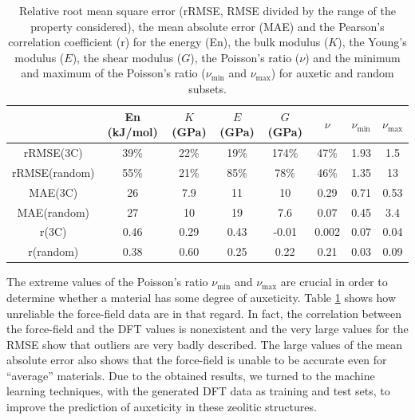 \documentclass[journal=jacsat,manuscript=article]{achemso}
\begin{document}
\begin{table}[ht]
\small
\centering
\begin{tabular}{|c|c|c|c|c|c|c|c|}
\hline
 &En (kJ/mol) & $K$ (GPa)&$E$ (GPa)&$G$ (GPa)&$\nu$&$\nu_{\min}$ & $\nu_{\max}$\\
\hline
rRMSE(3C)         & 39\%          & 22\%         & 19\%        & 174\%      & 47\% & 1.93         & 1.5 \\
rRMSE(random)& 55\%          & 21\%         & 85\%        & 78\%        & 46\%& 1.35         & 13   \\
\hline
\hline
MAE(3C)           & 26                & 7.9            & 11             & 10             & 0.29 & 0.71            & 0.53  \\
MAE(random)  & 27                & 10             & 19             & 7.6            & 0.07 & 0.45            & 3.4 \\
\hline
\hline
r(3C)                  & 0.46            & 0.29           & 0.43           & -0.01        & 0.002 & 0.07            & 0.04  \\
r(random)         & 0.38            & 0.60           & 0.25           & 0.22         & 0.21& 0.03            & 0.09  \\
\hline
\end{tabular}
\caption{\label{tab_meca_ff} Relative root mean square error (rRMSE, RMSE divided by the range of the property considered), the mean absolute error (MAE) and the Pearson's correlation coefficient (r) for the energy (En), the bulk modulus ($K$), the Young's modulus ($E$), the shear modulus ($G$), the Poisson's ratio ($\nu$) and the minimum and maximum of the Poisson's ratio ($\nu_{\min}$ and $\nu_{\max}$) for auxetic and random subsets.}
\end{table}

The extreme values of the Poisson's ratio $\nu_{\min}$ and $\nu_{\max}$ are crucial in order to determine whether a material has some degree of auxeticity. Table \ref{tab_meca_ff} shows how unreliable the force-field data are in that regard. In fact, the correlation between the force-field and the DFT values is nonexistent and the very large values for the RMSE show that outliers are very badly described. The large values of the mean absolute error also shows that the force-field is unable to be accurate even for ``average'' materials. Due to the obtained results, we turned to the machine learning techniques, with the generated DFT data as training and test sets, to improve the prediction of auxeticity in these zeolitic structures.
\end{document}
